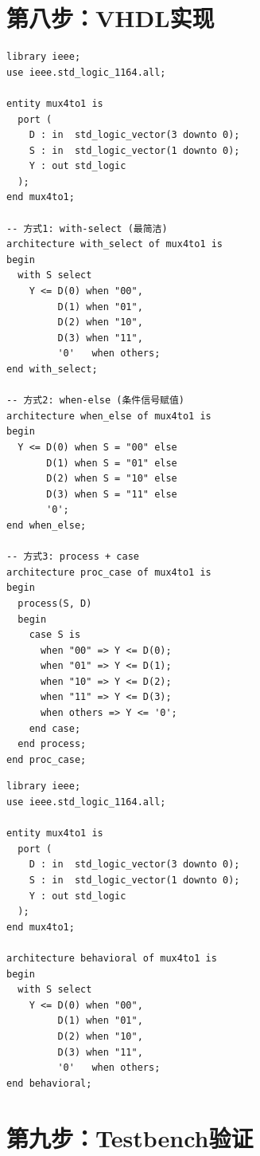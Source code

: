 \section{第八步：VHDL实现}

\begin{lstlisting}[caption={4选1 MUX（多种实现方式）}]
library ieee;
use ieee.std_logic_1164.all;

entity mux4to1 is
  port (
    D : in  std_logic_vector(3 downto 0);
    S : in  std_logic_vector(1 downto 0);
    Y : out std_logic
  );
end mux4to1;

-- 方式1: with-select (最简洁)
architecture with_select of mux4to1 is
begin
  with S select
    Y <= D(0) when "00",
         D(1) when "01",
         D(2) when "10",
         D(3) when "11",
         '0'   when others;
end with_select;

-- 方式2: when-else (条件信号赋值)
architecture when_else of mux4to1 is
begin
  Y <= D(0) when S = "00" else
       D(1) when S = "01" else
       D(2) when S = "10" else
       D(3) when S = "11" else
       '0';
end when_else;

-- 方式3: process + case
architecture proc_case of mux4to1 is
begin
  process(S, D)
  begin
    case S is
      when "00" => Y <= D(0);
      when "01" => Y <= D(1);
      when "10" => Y <= D(2);
      when "11" => Y <= D(3);
      when others => Y <= '0';
    end case;
  end process;
end proc_case;
\end{lstlisting}

\begin{lstlisting}[caption={完整4选1 MUX实体}]
library ieee;
use ieee.std_logic_1164.all;

entity mux4to1 is
  port (
    D : in  std_logic_vector(3 downto 0);
    S : in  std_logic_vector(1 downto 0);
    Y : out std_logic
  );
end mux4to1;

architecture behavioral of mux4to1 is
begin
  with S select
    Y <= D(0) when "00",
         D(1) when "01",
         D(2) when "10",
         D(3) when "11",
         '0'   when others;
end behavioral;
\end{lstlisting}

\section{第九步：Testbench验证}

